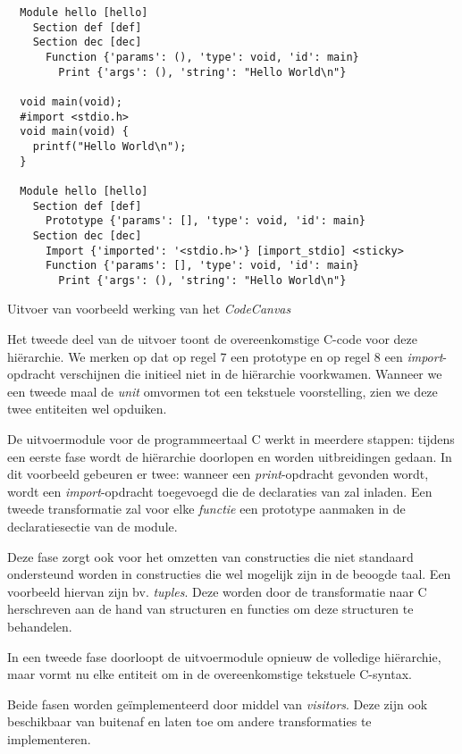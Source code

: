 \begin{listing}[ht]
  \begin{verbatim}
  Module hello [hello]
    Section def [def]
    Section dec [dec]
      Function {'params': (), 'type': void, 'id': main}
        Print {'args': (), 'string': "Hello World\n"}

  void main(void);
  #import <stdio.h>
  void main(void) {
    printf("Hello World\n");
  }
  
  Module hello [hello]
    Section def [def]
      Prototype {'params': [], 'type': void, 'id': main}
    Section dec [dec]
      Import {'imported': '<stdio.h>'} [import_stdio] <sticky>
      Function {'params': [], 'type': void, 'id': main}
        Print {'args': (), 'string': "Hello World\n"}
  \end{verbatim}
  \vspace{-5mm}
  \caption{Uitvoer van voorbeeld werking van het \emph{CodeCanvas}}
  \label{lst:codecanvas-output}
\end{listing}

Het tweede deel van de uitvoer toont de overeenkomstige C-code voor deze
hi\"erarchie. We merken op dat op regel 7 een prototype en op regel 8 een
\emph{import}-opdracht verschijnen die initieel niet in de hi\"erarchie
voorkwamen. Wanneer we een tweede maal de \emph{unit} omvormen tot een
tekstuele voorstelling, zien we deze twee entiteiten wel opduiken.

De uitvoermodule voor de programmeertaal C werkt in meerdere stappen: tijdens
een eerste fase wordt de hi\"erarchie doorlopen en worden uitbreidingen gedaan.
In dit voorbeeld gebeuren er twee: wanneer een \emph{print}-opdracht gevonden
wordt, wordt een \emph{import}-opdracht toegevoegd die de declaraties van
 zal inladen. Een tweede transformatie zal voor elke
\emph{functie} een prototype aanmaken in de declaratiesectie van de module.

Deze fase zorgt ook voor het omzetten van constructies die niet standaard
ondersteund worden in constructies die wel mogelijk zijn in de beoogde taal.
Een voorbeeld hiervan zijn bv. \emph{tuples}. Deze worden door de transformatie
naar C herschreven aan de hand van structuren en functies om deze structuren te
behandelen.

In een tweede fase doorloopt de uitvoermodule opnieuw de volledige
hi\"erarchie, maar vormt nu elke entiteit om in de overeenkomstige tekstuele
C-syntax.

Beide fasen worden ge\"implementeerd door middel van \emph{visitors}. Deze zijn
ook beschikbaar van buitenaf en laten toe om andere transformaties te
implementeren.

